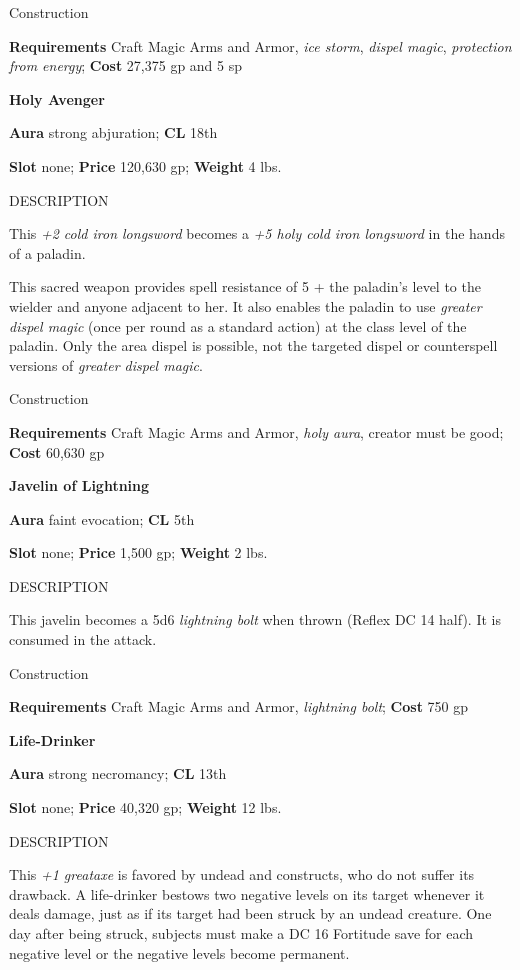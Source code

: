 Construction
				
\textbf{Requirements} Craft Magic Arms and Armor, \textit{ice storm}, \textit{dispel magic}, \textit{protection from energy}; \textbf{Cost }27,375 gp and 5 sp
				
\textbf{Holy Avenger}
				
\textbf{Aura} strong abjuration; \textbf{CL} 18th
				
\textbf{Slot} none; \textbf{Price} 120,630 gp; \textbf{Weight} 4 lbs.
				
DESCRIPTION
				
This \textit{+2 cold iron longsword} becomes a \textit{+5 holy cold iron longsword} in the hands of a paladin.
				
This sacred weapon provides spell resistance of 5 + the paladin's level to the wielder and anyone adjacent to her. It also enables the paladin to use \textit{greater dispel magic} (once per round as a standard action) at the class level of the paladin. Only the area dispel is possible, not the targeted dispel or counterspell versions of \textit{greater dispel magic}.
				
Construction
				
\textbf{Requirements} Craft Magic Arms and Armor, \textit{holy aura}, creator must be good; \textbf{Cost }60,630 gp
				
\textbf{Javelin of Lightning}
				
\textbf{Aura} faint evocation; \textbf{CL} 5th
				
\textbf{Slot} none; \textbf{Price} 1,500 gp; \textbf{Weight} 2 lbs.
				
DESCRIPTION
				
This javelin becomes a 5d6 \textit{lightning bolt} when thrown (Reflex DC 14 half). It is consumed in the attack. 
				
Construction
				
\textbf{Requirements} Craft Magic Arms and Armor, \textit{lightning bolt}; \textbf{Cost }750 gp
				
\textbf{Life-Drinker}
				
\textbf{Aura} strong necromancy;\textbf{ CL }13th
				
\textbf{Slot} none; \textbf{Price} 40,320 gp; \textbf{Weight} 12 lbs.
				
DESCRIPTION
				
This \textit{+1 greataxe} is favored by undead and constructs, who do not suffer its drawback. A life-drinker bestows two negative levels on its target whenever it deals damage, just as if its target had been struck by an undead creature. One day after being struck, subjects must make a DC 16 Fortitude save for each negative level or the negative levels become permanent.
				
